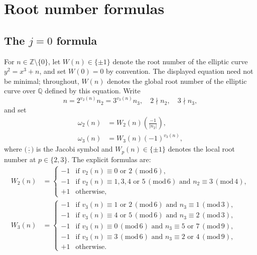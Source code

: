 \documentclass[12pt,reqno]{amsart}
\numberwithin{equation}{section}
\theoremstyle{definition}
\newcommand{\ZZ}{\mathbb{Z}}
\newcommand{\QQ}{\mathbb{Q}}
\newcommand{\rw}{W}
\renewcommand{\pmod}[1]{\,(\mathrm{mod}\,#1)}
\begin{document}
\section{Root number formulas}\label{sec:local}

\subsection{The \texorpdfstring{$j=0$}{j=0} formula}

For $n\in\ZZ\setminus\{0\}$, let $\rw(n)\in\{\pm1\}$ denote the root number of the elliptic curve $y^2=x^3+n$, and set $\rw(0)=0$ by convention.
The displayed equation need not be minimal; throughout, $\rw(n)$ denotes the global root number of the elliptic curve over $\QQ$ defined by this equation.
Write
\begin{equation}\label{eq:def-units-j0}
n=2^{v_2(n)}n_2=3^{v_3(n)}n_3,
\quad 2\nmid n_2,\quad 3\nmid n_3,
\end{equation}
and set
\begin{equation}\label{eq:def-omega23}
\begin{aligned}
\omega_2(n)&=\rw_2(n)\left(\frac{-1}{|n_2|}\right), \\
\omega_3(n)&=\rw_3(n)(-1)^{v_3(n)},
\end{aligned}
\end{equation}
where $\bigl(\frac{\cdot}{\cdot}\bigr)$ is the Jacobi symbol and $\rw_p(n)\in\{\pm1\}$ denotes the local root number at $p\in\{2,3\}$.
The explicit formulas \cite[Lemma~4.1]{VA} are:
\begin{align*}
\rw_{2}(n)&=
\begin{cases}
-1 & \text{if } v_{2}(n)\equiv 0 \text{ or } 2 \pmod 6,\\
-1 & \text{if } v_{2}(n)\equiv 1,3,4 \text{ or } 5 \pmod 6 \text{ and } n_{2}\equiv 3 \pmod 4,\\
+1 & \text{otherwise},
\end{cases}\\
\rw_{3}(n)&=
\begin{cases}
-1 & \text{if } v_{3}(n)\equiv 1 \text{ or } 2 \pmod 6 \text{ and } n_{3}\equiv 1 \pmod 3,\\
-1 & \text{if } v_{3}(n)\equiv 4 \text{ or } 5 \pmod 6 \text{ and } n_{3}\equiv 2 \pmod 3,\\
-1 & \text{if } v_{3}(n)\equiv 0 \pmod 6 \text{ and } n_{3}\equiv 5 \text{ or } 7 \pmod 9,\\
-1 & \text{if } v_{3}(n)\equiv 3 \pmod 6 \text{ and } n_{3}\equiv 2 \text{ or } 4 \pmod 9,\\
+1 & \text{otherwise}.
\end{cases}
\end{align*}
\end{document}
